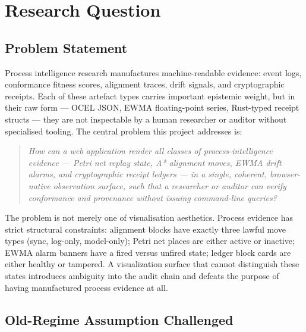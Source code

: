 
\section{Research Question}
\label{sec:experiments-visualizer-nextjs-rq}

\subsection{Problem Statement}
\label{sec:experiments-visualizer-nextjs-rq-problem}

Process intelligence research manufactures machine-readable evidence: event logs, conformance
fitness scores, alignment traces, drift signals, and cryptographic receipts. Each of these
artefact types carries important epistemic weight, but in their raw form --- OCEL JSON, EWMA
floating-point series, Rust-typed receipt structs --- they are not inspectable by a human
researcher or auditor without specialised tooling. The central problem this project addresses is:

\begin{quote}
\textit{How can a web application render all classes of process-intelligence evidence
--- Petri net replay state, A{*} alignment moves, EWMA drift alarms, and cryptographic receipt
ledgers --- in a single, coherent, browser-native observation surface, such that a researcher
or auditor can verify conformance and provenance without issuing command-line queries?}
\end{quote}

The problem is not merely one of visualisation aesthetics. Process evidence has strict
structural constraints: alignment blocks have exactly three lawful move types (sync, log-only,
model-only); Petri net places are either active or inactive; EWMA alarm banners have a fired
versus unfired state; ledger block cards are either healthy or tampered. A visualization surface
that cannot distinguish these states introduces ambiguity into the audit chain and defeats the
purpose of having manufactured process evidence at all.

\subsection{Old-Regime Assumption Challenged}
\label{sec:experiments-visualizer-nextjs-rq-old-regime}


